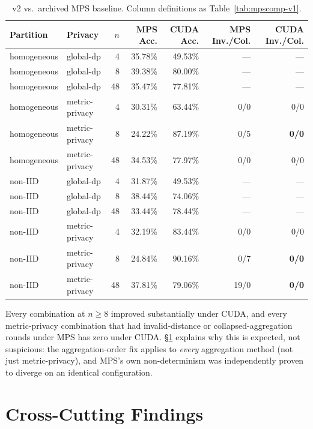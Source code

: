 \documentclass[11pt]{article}
\begin{document}
\begin{table}[h]
\centering
\footnotesize
\begin{tabular}{llrrrrr}
\toprule
Partition & Privacy & $n$ & MPS Acc. & CUDA Acc. & MPS Inv./Col. & CUDA Inv./Col. \\
\midrule
homogeneous & global-dp      & 4  & 35.78\% & 49.53\% & --- & --- \\
homogeneous & global-dp      & 8  & 39.38\% & 80.00\% & --- & --- \\
homogeneous & global-dp      & 48 & 35.47\% & 77.81\% & --- & --- \\
homogeneous & metric-privacy & 4  & 30.31\% & 63.44\% & 0/0  & 0/0 \\
homogeneous & metric-privacy & 8  & 24.22\% & 87.19\% & 0/5  & \textbf{0/0} \\
homogeneous & metric-privacy & 48 & 34.53\% & 77.97\% & 0/0  & 0/0 \\
non-IID     & global-dp      & 4  & 31.87\% & 49.53\% & --- & --- \\
non-IID     & global-dp      & 8  & 38.44\% & 74.06\% & --- & --- \\
non-IID     & global-dp      & 48 & 33.44\% & 78.44\% & --- & --- \\
non-IID     & metric-privacy & 4  & 32.19\% & 83.44\% & 0/0  & 0/0 \\
non-IID     & metric-privacy & 8  & 24.84\% & 90.16\% & 0/7  & \textbf{0/0} \\
non-IID     & metric-privacy & 48 & 37.81\% & 79.06\% & 19/0 & \textbf{0/0} \\
\bottomrule
\end{tabular}
\caption{v2 vs.\ archived MPS baseline. Column definitions as Table~\ref{tab:mpscomp-v1}.}
\label{tab:mpscomp-v2}
\end{table}

\noindent Every combination at $n \geq 8$ improved substantially under CUDA, and every
metric-privacy combination that had invalid-distance or collapsed-aggregation rounds under MPS has
zero under CUDA. \S\ref{sec:findings} explains why this is expected, not suspicious: the
aggregation-order fix applies to \emph{every} aggregation method (not just metric-privacy), and MPS's
own non-determinism was independently proven to diverge on an identical configuration.

\section{Cross-Cutting Findings}
\label{sec:findings}
\end{document}
